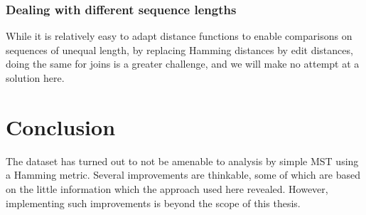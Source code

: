 \documentclass[fleqn]{book}
\begin{document}
\subsection{Dealing with different sequence
lengths}\label{dealing-with-different-sequence-lengths}

While it is relatively easy to adapt distance functions to enable
comparisons on sequences of unequal length, by replacing Hamming
distances by edit distances, doing the same for joins is a greater
challenge, and we will make no attempt at a solution here.

\chapter{Conclusion}\label{conclusion}

The dataset has turned out to not be amenable to analysis by simple MST
using a Hamming metric. Several improvements are thinkable, some of
which are based on the little information which the approach used here
revealed. However, implementing such improvements is beyond the scope of
this thesis.
\end{document}

